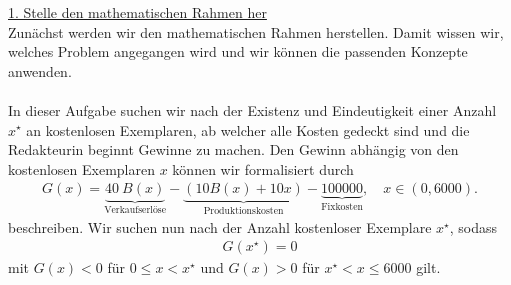 \underline{1. Stelle den mathematischen Rahmen her}\\
Zunächst werden wir den mathematischen Rahmen herstellen. Damit wissen wir, welches Problem angegangen wird und wir können die passenden Konzepte anwenden.\\
\\
In dieser Aufgabe suchen wir nach der Existenz und Eindeutigkeit einer Anzahl $x^\star $ an kostenlosen Exemplaren, ab welcher alle Kosten gedeckt sind und die Redakteurin beginnt Gewinne zu machen. Den Gewinn abhängig von den kostenlosen Exemplaren $x$ können wir formalisiert durch
\begin{align*}
	G(x) = \underbrace{40 \ B(x)}_{\textrm{Verkaufserlöse}} - \underbrace{(10 B(x) + 10 x)}_{\textrm{Produktionskosten}} - \underbrace{100000}_{\textrm{Fixkosten}}, \quad
	x \in (0, 6000).
\end{align*}
beschreiben. Wir suchen nun nach der Anzahl kostenloser Exemplare $x^\star$, sodass 
\begin{align*}
G(x^\star ) = 0
\end{align*}
mit $G(x) < 0$ für $0 \leq x < x^\star$ und $G(x) > 0$ für $x^\star < x \leq 6000$ gilt.\\
\\

